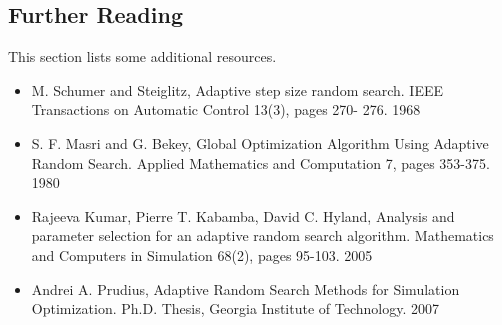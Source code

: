 \subsection{Further Reading}
This section lists some additional resources.

\begin{itemize}
	\item M. Schumer and Steiglitz, Adaptive step size random search. IEEE Transactions on Automatic Control 13(3), pages 270- 276. 1968
	\item S. F. Masri and G. Bekey, Global Optimization Algorithm Using Adaptive Random Search. Applied Mathematics and Computation 7, pages 353-375. 1980
	\item  Rajeeva Kumar, Pierre T. Kabamba, David C. Hyland, Analysis and parameter selection for an adaptive random search algorithm. Mathematics and Computers in Simulation 68(2), pages 95-103. 2005
	\item Andrei A. Prudius, Adaptive Random Search Methods for Simulation Optimization. Ph.D. Thesis, Georgia Institute of Technology. 2007
\end{itemize}